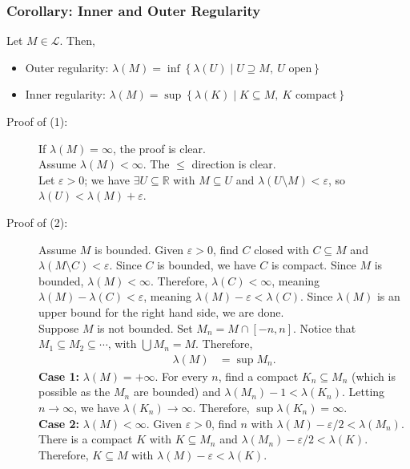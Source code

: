 \documentclass[10pt]{extarticle}
\newcommand{\R}{\mathbb{R}}
\begin{document}
  \subsubsection{Corollary: Inner and Outer Regularity}%
  Let $M\in \mathcal{L}$. Then,
  \begin{itemize}
    \item Outer regularity: $\displaystyle \lambda(M) = \inf\left\{\lambda(U)\mid U\supseteq M,~U\text{ open}\right\}$
    \item Inner regularity: $\displaystyle \lambda(M) = \sup\left\{\lambda(K)\mid K\subseteq M,~K\text{ compact}\right\}$
  \end{itemize}
  \begin{description}
    \item[Proof of (1):] If $\lambda(M) = \infty$, the proof is clear.\\

      Assume $\lambda(M) < \infty$. The $\leq$ direction is clear.\\

      Let $\varepsilon > 0$; we have $\exists U\subseteq \R$ with $M\subseteq U$ and $\lambda(U\setminus M) < \varepsilon$, so $\lambda(U) < \lambda(M) + \varepsilon$.
    \item[Proof of (2):] Assume $M$ is bounded. Given $\varepsilon > 0$, find $C$ closed with $C\subseteq M$ and $\lambda(M\setminus C) < \varepsilon$. Since $C$ is bounded, we have $C$ is compact. Since $M$ is bounded, $\lambda(M) < \infty$. Therefore, $\lambda(C) < \infty$, meaning $\lambda(M) - \lambda(C) < \varepsilon$, meaning $\lambda(M) - \varepsilon < \lambda(C)$. Since $\lambda(M)$ is an upper bound for the right hand side, we are done.\\

      Suppose $M$ is not bounded. Set $M_n = M\cap [-n,n]$. Notice that $M_1 \subseteq M_2 \subseteq \cdots$, with $\bigcup M_n = M$. Therefore,
      \begin{align*}
        \lambda(M) &= \sup M_n.
      \end{align*}
      \textbf{Case 1:} $\lambda(M) = +\infty$. For every $n$, find a compact $K_n\subseteq M_n$ (which is possible as the $M_n$ are bounded) and $\lambda(M_n) - 1 < \lambda(K_n)$. Letting $n\rightarrow \infty$, we have $\lambda(K_n) \rightarrow \infty$. Therefore, $\sup \lambda(K_n) = \infty$.\\

      \textbf{Case 2:} $\lambda(M) < \infty$. Given $\varepsilon > 0$, find $n$ with $\lambda(M) - \varepsilon/2 < \lambda(M_n)$. There is a compact $K$ with $K\subseteq M_n$ and $\lambda(M_n) - \varepsilon/2 < \lambda(K)$. Therefore, $K\subseteq M$ with $\lambda(M) - \varepsilon < \lambda(K)$.
  \end{description}
\end{document}
